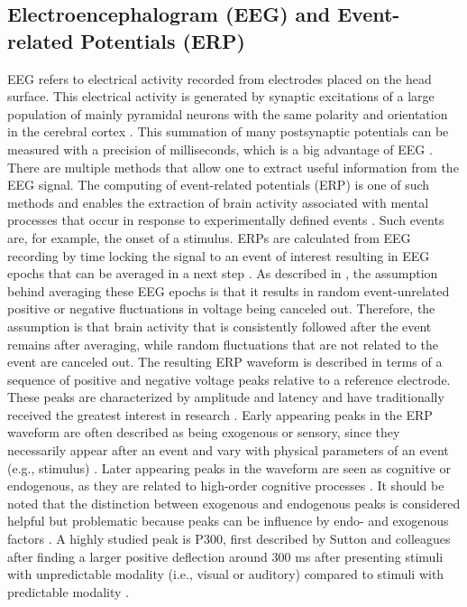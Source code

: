 \subsection{Electroencephalogram (EEG) and Event-related Potentials (ERP)}
EEG refers to electrical activity recorded from electrodes placed on the head surface. This electrical activity is generated by synaptic excitations of a large population of mainly pyramidal neurons with the same polarity and orientation in the cerebral cortex \parencite{luckIntroductionEventrelatedPotential2014,teplanFUNDAMENTALSEEGMEASUREMENT2002}. This summation of many postsynaptic potentials can be measured with a precision of milliseconds, which is a big advantage of EEG \parencite{lightElectroencephalographyEEGEventRelated2010}. 
There are multiple methods that allow one to extract useful information from the EEG signal. 
The computing of event-related potentials (ERP) is one of such methods and enables the extraction of brain activity associated with mental processes that occur in response to experimentally defined events \parencite{luckIntroductionEventrelatedPotential2014, surEventrelatedPotentialOverview2009}. Such events are, for example, the onset of a stimulus. ERPs are calculated from EEG recording by time locking the signal to an event of interest resulting in EEG epochs that can be averaged in a next step \parencite{luckIntroductionEventrelatedPotential2014}.  As described in \textcite{luckIntroductionEventrelatedPotential2014}, the assumption behind averaging these EEG epochs is that it results in random event-unrelated positive or negative fluctuations in voltage being canceled out. Therefore, the assumption is that brain activity that is consistently followed after the event remains after averaging, while random fluctuations that are not related to the event are canceled out. The resulting ERP waveform is described in terms of a sequence of positive and negative voltage peaks relative to a reference electrode. These peaks are characterized by amplitude and latency and have traditionally received the greatest interest in research \parencite{luckIntroductionEventrelatedPotential2014, luckOxfordHandbookEventrelated2012}. Early appearing peaks in the ERP waveform are often described as being exogenous or sensory, since they necessarily appear after an event and vary with physical parameters of an event (e.g., stimulus) \parencite{luckIntroductionEventrelatedPotential2014, surEventrelatedPotentialOverview2009}. Later appearing peaks in the waveform are seen as cognitive or endogenous, as they are related to high-order cognitive processes \parencite{luckIntroductionEventrelatedPotential2014, luckOxfordHandbookEventrelated2012, surEventrelatedPotentialOverview2009}. It should be noted that the distinction between exogenous and endogenous peaks is considered helpful but problematic because peaks can be influence by endo- and exogenous factors \parencite{luckIntroductionEventrelatedPotential2014}.
A highly studied peak is P300, first described by Sutton and colleagues after finding a larger positive deflection around 300 ms after presenting stimuli with unpredictable modality (i.e., visual or auditory) compared to stimuli with predictable modality \parencite{suttonEvokedPotentialCorrelatesStimulus1965}. 

